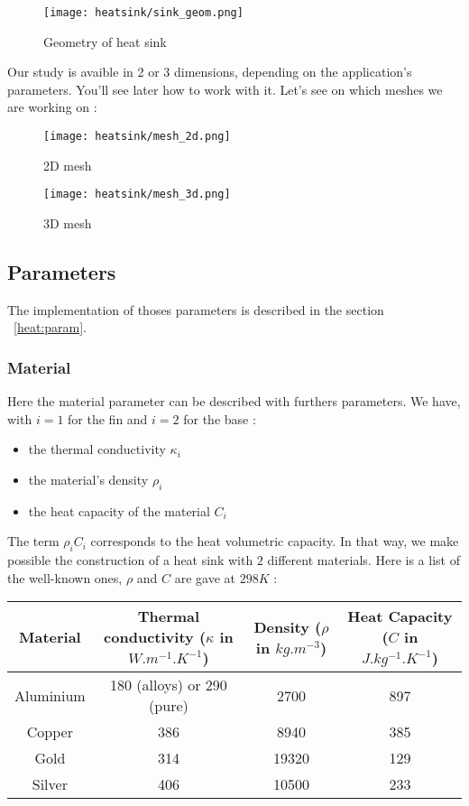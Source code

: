 \begin{figure}[!h]
\centering
\texttt{[image: heatsink/sink\_geom.png]}
\caption{Geometry of heat sink}
\end{figure}

Our study is avaible in 2 or 3 dimensions, depending on the application's parameters. You'll see later how to work with it. Let's see on which meshes we are working on :
\begin{figure}[!h]
\begin{minipage}[b]{.50\linewidth}
\centering
\texttt{[image: heatsink/mesh\_2d.png]}
\caption{2D mesh}
\end{minipage}
\begin{minipage}[b]{.50\linewidth}
\centering
\texttt{[image: heatsink/mesh\_3d.png]}
\caption{3D mesh}
\end{minipage}
\end{figure}

\subsection{Parameters}
The implementation of thoses parameters is described in the section ~\ref{heat:param}.

\subsubsection{Material}

Here the material parameter can be described with furthers parameters. We have, with $i=1$ for the fin and $i=2$ for the base :
\begin{itemize}
\item the thermal conductivity $\kappa_i$

\item the material's density $\rho_i$

\item the heat capacity of the material $C_i$

\end{itemize}
The term $\rho_i C_i$ corresponds to the heat volumetric capacity. In that way, we make possible the construction of a heat sink with $2$ different materials. Here is a list of the well-known ones, $\rho$ and $C$ are gave at $298 K$ :

\begin{center}
\begin{tabular}{|c|c|c|c|}
  \hline
  \textbf{Material} & \textbf{Thermal conductivity} ($\kappa$ in $W.m^{-1}.K^{-1}$) & \textbf{Density }($\rho$ in $kg.m^{-3}$) & \textbf{Heat Capacity} ($C$ in $J.kg^{-1}.K^{-1}$) \\
  \hline
  Aluminium & 180 (alloys) or 290 (pure) & 2700 & 897 \\
  \hline
  Copper & 386 & 8940 & 385 \\
  \hline
  Gold & 314 & 19320 & 129 \\
  \hline
  Silver & 406 & 10500 & 233 \\
  \hline
\end{tabular}
\end{center}

